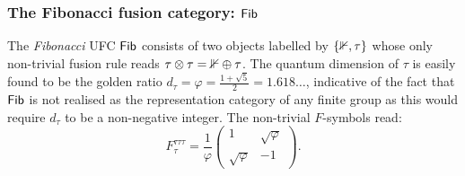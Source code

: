 \subsubsection{The Fibonacci fusion category: $\mathsf{Fib}$} The \emph{Fibonacci} UFC $\mathsf{Fib}$ consists of two objects labelled by $\{\mathbb 1, \tau\}$ whose only non-trivial fusion rule reads $\tau\otimes\tau=\mathbb 1\oplus \tau$. The quantum dimension of $\tau$ is easily found to be the golden ratio $d_\tau = \varphi = \frac{1+\sqrt 5}{2}=1.618\dots$, indicative of the fact that $\mathsf{Fib}$ is not realised as the representation category of any finite group as this would require $d_\tau$ to be a non-negative integer. The non-trivial $F$-symbols read:
\begin{equation}
	F^{\tau\tau\tau}_{\tau} =
	\frac{1}{\varphi}
	\begin{pmatrix}
		1 & \sqrt{\varphi} \\
		\sqrt{\varphi} & -1
	\end{pmatrix}.
\end{equation}

